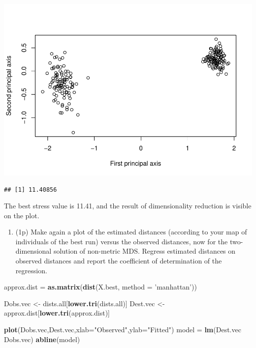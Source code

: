 \documentclass[
]{article}
\newenvironment{Shaded}{\begin{snugshade}}{\end{snugshade}}
\newcommand{\DataTypeTok}[1]{\textcolor[rgb]{0.13,0.29,0.53}{#1}}
\newcommand{\KeywordTok}[1]{\textcolor[rgb]{0.13,0.29,0.53}{\textbf{#1}}}
\newcommand{\NormalTok}[1]{#1}
\newcommand{\OperatorTok}[1]{\textcolor[rgb]{0.81,0.36,0.00}{\textbf{#1}}}
\newcommand{\StringTok}[1]{\textcolor[rgb]{0.31,0.60,0.02}{#1}}
\providecommand{\tightlist}{%
  \setlength{\itemsep}{0pt}\setlength{\parskip}{0pt}}
\begin{document}
\includegraphics{P052020_Substructure_files/figure-latex/10th-1.pdf}

\begin{verbatim}
## [1] 11.40856
\end{verbatim}

The best stress value is 11.41, and the result of dimensionality
reduction is visible on the plot.

\begin{enumerate}
\def\labelenumi{\arabic{enumi}.}
\setcounter{enumi}{10}
\tightlist
\item
  (1p) Make again a plot of the estimated distances (according to your
  map of individuals of the best run) versus the observed distances, now
  for the two-dimensional solution of non-metric MDS. Regress estimated
  distances on observed distances and report the coefficient of
  determination of the regression.
\end{enumerate}

\begin{Shaded}
\begin{Highlighting}[]
\NormalTok{approx.dist =}\StringTok{ }\KeywordTok{as.matrix}\NormalTok{(}\KeywordTok{dist}\NormalTok{(X.best, }\DataTypeTok{method =} \StringTok{'manhattan'}\NormalTok{))}

\NormalTok{Dobs.vec <-}\StringTok{ }\NormalTok{dists.all[}\KeywordTok{lower.tri}\NormalTok{(dists.all)]}
\NormalTok{Dest.vec <-}\StringTok{ }\NormalTok{approx.dist[}\KeywordTok{lower.tri}\NormalTok{(approx.dist)]}

\KeywordTok{plot}\NormalTok{(Dobs.vec,Dest.vec,}\DataTypeTok{xlab=}\StringTok{"Observed"}\NormalTok{,}\DataTypeTok{ylab=}\StringTok{"Fitted"}\NormalTok{)}
\NormalTok{model =}\StringTok{ }\KeywordTok{lm}\NormalTok{(Dest.vec }\OperatorTok{~}\StringTok{ }\NormalTok{Dobs.vec)}
\KeywordTok{abline}\NormalTok{(model)}
\end{Highlighting}
\end{Shaded}
\end{document}
